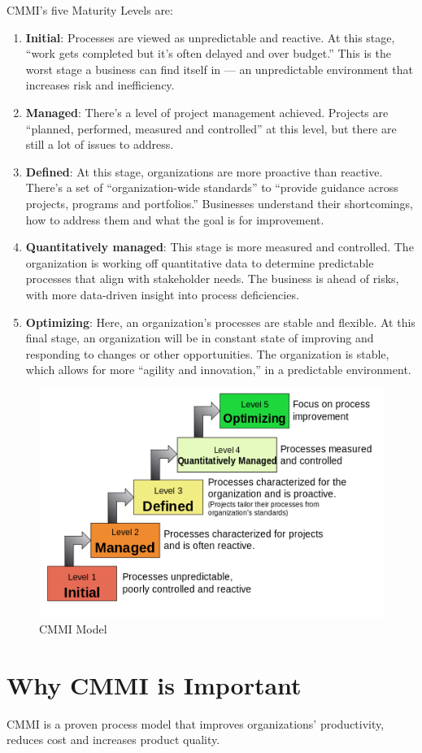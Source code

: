 \documentclass[11pt]{article}
\begin{document}
CMMI’s five Maturity Levels are:
\begin{enumerate}
\item \textbf{Initial}: Processes are viewed as unpredictable and reactive. At this stage, “work gets completed but it’s often delayed and over budget.” This is the worst stage a business can find itself in — an unpredictable environment that increases risk and inefficiency.
\item \textbf{Managed}: There’s a level of project management achieved. Projects are “planned, performed, measured and controlled” at this level, but there are still a lot of issues to address.
\item \textbf{Defined}: At this stage, organizations are more proactive than reactive. There’s a set of “organization-wide standards” to “provide guidance across projects, programs and portfolios.” Businesses understand their shortcomings, how to address them and what the goal is for improvement.

\item \textbf{Quantitatively managed}: This stage is more measured and controlled. The organization is working off quantitative data to determine predictable processes that align with stakeholder needs. The business is ahead of risks, with more data-driven insight into process deficiencies.

\item \textbf{Optimizing}: Here, an organization’s processes are stable and flexible. At this final stage, an organization will be in constant state of improving and responding to changes or other opportunities. The organization is stable, which allows for more “agility and innovation,” in a predictable environment.

\end{enumerate}


\begin{figure}[htp]
\centering
\includegraphics[scale=0.6]{images/CMMI.png}
\caption{CMMI Model}
\label{}
\end{figure}

\section{Why CMMI is Important}
CMMI is a proven process model that improves organizations' productivity, reduces cost and increases product quality.



\end{document}
